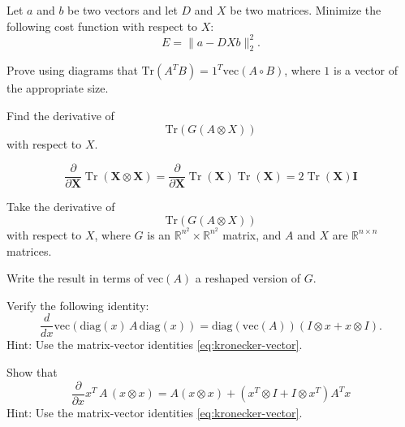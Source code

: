 \begin{exercise}
   Let $a$ and $b$ be two vectors and let $D$ and $X$ be two matrices.
   Minimize the following cost function with respect to $X$:
   \[
      E = \|a - D X b\|_2^2.
   \]
\end{exercise}

\begin{exercise}
   Prove using diagrams that $\mathrm{Tr}(A^T B) = 1^T \mathrm{vec}(A \circ B)$,
   where $1$ is a vector of the appropriate size.
\end{exercise}

\begin{exercise}
   Find the derivative of
   \[
      \mathrm{Tr}(G(A\otimes X))
   \]
   with respect to $X$.
\end{exercise}

\begin{exercise}
   \[\frac{\partial}{\partial \mathbf{X}} \operatorname{Tr}(\mathbf{X} \otimes \mathbf{X})=\frac{\partial}{\partial \mathbf{X}} \operatorname{Tr}(\mathbf{X}) \operatorname{Tr}(\mathbf{X})=2 \operatorname{Tr}(\mathbf{X}) \mathbf{I}\]
\end{exercise}

\begin{exercise}
   Take the derivative of
   \[
      \mathrm{Tr}(G (A \otimes X))
   \]
   with respect to $X$, where $G$ is an $\mathbb R^{n^2} \times \mathbb R^{n^2}$ matrix,
   and $A$ and $X$ are $\mathbb R^{n \times n}$ matrices.

   Write the result in terms of $\mathrm{vec}(A)$ a reshaped version of $G$.
\end{exercise}

\begin{exercise}
   Verify the following identity:
   \[
      \frac{d}{dx}
      \mathrm{vec}(
         \mathrm{diag}(x)\, A\, \mathrm{diag}(x)
         )
         = \mathrm{diag}(\mathrm{vec}(A)) (I \otimes x + x \otimes I)
         .
   \]
      Hint: Use the matrix-vector identities \eqref{eq:kronecker-vector}.
\end{exercise}

\begin{exercise}
      Show that
      \[
         \frac{\partial}{\partial x} x^T\, A\, (x \otimes x)
         =
         A(x\otimes x) + (x^T \otimes I + I \otimes x^T) A^T x
      \]
      Hint: Use the matrix-vector identities \eqref{eq:kronecker-vector}.
\end{exercise}

